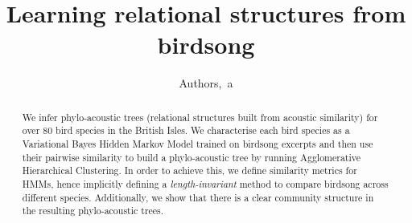 \documentclass[pdftex,11pt,a4paper]{article}
\theoremstyle{definition}
\theoremstyle{remark}
\begin{document}
\title{Learning relational structures from birdsong}
\author{Authors,~a}

\maketitle


\begin{abstract}
We infer phylo-acoustic trees (relational structures built from acoustic similarity) for over 80 bird species in the British Isles. We characterise each bird species as a Variational Bayes Hidden Markov Model trained on birdsong excerpts and then use their pairwise similarity to build a phylo-acoustic tree by running Agglomerative Hierarchical Clustering. In order to achieve this, we define similarity metrics for HMMs, hence implicitly defining a \emph{length-invariant} method to compare birdsong across different species. Additionally, we show that there is a clear community structure in the resulting phylo-acoustic trees.
\end{abstract}
\end{document}
